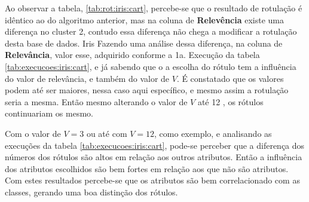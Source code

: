 Ao observar a tabela, \ref{tab:rot:iris:cart}, percebe-se que o resultado de rotulação é idêntico ao do algoritmo anterior, mas na coluna de \textbf{Relevência} existe uma diferença no cluster 2, contudo essa diferença não chega  a modificar a rotulação desta base de dados.
Iris 
Fazendo uma análise dessa diferença, na coluna de \textbf{Relevância}, valor esse, adquirido conforme a 1a. Execução da tabela \ref{tab:execucoes:iris:cart}, e já sabendo que o a escolha do rótulo tem a influência do valor de relevância, e também do valor de ${V}$. É constatado que os valores podem até ser maiores, nessa caso aqui específico, e mesmo assim a rotulação seria a mesma. Então mesmo alterando o valor de ${V}$ até 12 , os rótulos continuariam os mesmo.

Com o valor de ${V=3}$ ou até com ${V=12}$, como exemplo, e analisando as execuções da tabela \ref{tab:execucoes:iris:cart}, pode-se perceber que a diferença dos números dos rótulos são altos em relação aos outros atributos. Então a influência dos atributos escolhidos são bem fortes em relação aos que não são atributos. Com estes resultados percebe-se que os atributos são bem correlacionado com as classes, gerando uma boa distinção dos rótulos.  


